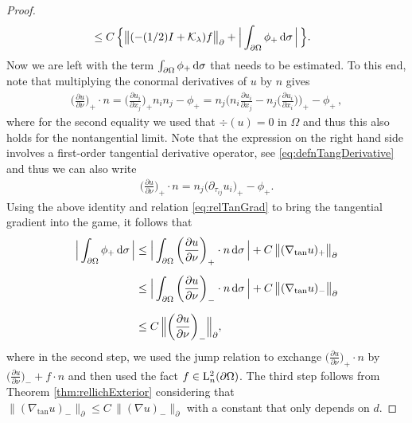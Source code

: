 \begin{proof}
\begin{align}
    \label{eq:estimatef}
    &\leq C \, \Big\{ \big\| (-(1/2)I + \mathcal{K}_\lambda) f \big\|^{}_\partial +  \Big| \int_{\partial\Omega} \phi_+ \, {\operatorname{d}\!{\sigma}} \, \Big|\,\Big\}.
  \end{align}
  Now we are left with the term $\int_{\partial\Omega} \phi_+ \, {\operatorname{d}\!{\sigma}}$ that needs to be estimated.
  To this end, note that multiplying the conormal derivatives of $u$ by $n$ gives
  \begin{align*}
    \bigg( \frac{\partial u}{\partial \nu} \bigg)_+ \cdot n
    = \bigg( \frac{\partial u_i}{\partial x_j}\bigg)_+ n_i n_j - \phi_+
    = n_j \bigg( n_i \frac{\partial u_i}{\partial x_j} - n_j \bigg( \frac{\partial u_i}{\partial x_i} \bigg) \bigg)_+ - \phi_+\, ,
  \end{align*}
  where for the second equality we used that $\div(u) = 0$ in $\Omega$ and thus this also holds for the nontangential limit.
  Note that the expression on the right hand side involves a first-order tangential derivative operator, see \eqref{eq:defnTangDerivative} and thus we can also write
  \begin{align*}
    \bigg( \frac{\partial u}{\partial \nu} \bigg)_+ \cdot n 
    = n_j \big( \partial_{\tau_{ij}}u_i \big)_+ - \phi_+.
  \end{align*}
  Using the above identity and relation \eqref{eq:relTanGrad} to bring the tangential gradient into the game, it follows that
  \begin{align}
    \Big| \int_{\partial\Omega} \phi_+ \, {\operatorname{d}\!{\sigma}} \, \Big|
    &\leq \Big| \int_{\partial\Omega} \bigg( \frac{\partial u}{\partial \nu} \bigg)_+ \cdot n \, {\operatorname{d}\!{\sigma}} \, \Big|  + C\, \big\|(\nabla_{\mathrm{tan}} u)_+ \big\|^{}_\partial \nonumber\\[0.5em]
    &\leq \Big| \int_{\partial\Omega} \bigg( \frac{\partial u}{\partial \nu} \bigg)_- \cdot n \, {\operatorname{d}\!{\sigma}} \, \Big| +  C\, \big\| (\nabla_{\mathrm{tan}} u)_-\big\|^{}_\partial \nonumber\\[0.5em]
    \label{eq:estimatephiplus}
    &\leq C\, \Big\| \bigg( \frac{\partial u}{\partial \nu} \bigg)_- \Big\|^{}_\partial,
  \end{align}
  where in the second step, we used the jump relation to exchange $\big(\frac{\partial u}{\partial \nu}\big)_+ \cdot n$ by $\big(\frac{\partial u}{\partial \nu} \big)_- + f \cdot n$ and then used the fact $f \in \mathrm{L}^2_n(\partial\Omega)$.
  The third step follows from Theorem \ref{thm:rellichExterior} considering that $\big\|(\nabla_{\mathrm{tan}} u)_- \big\|^{}_\partial \leq C\, \|(\nabla u)_- \|^{}_{\partial}$ with a constant that only depends on $d$.

\end{proof}
